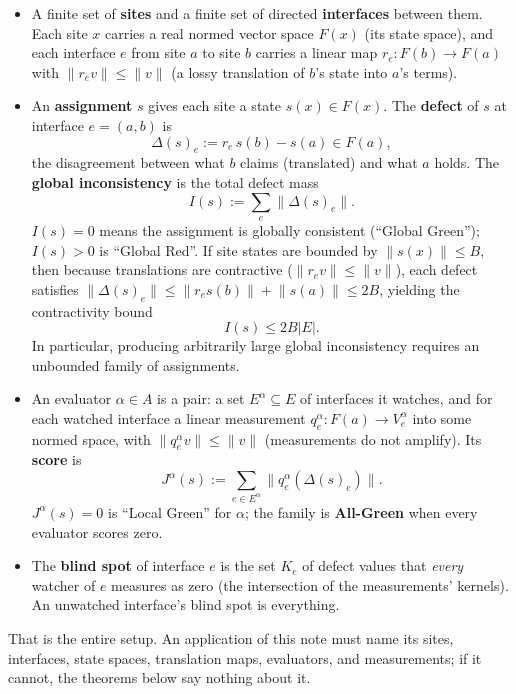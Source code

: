 \documentclass[
  11pt,
]{article}
\providecommand{\tightlist}{%
  \setlength{\itemsep}{0pt}\setlength{\parskip}{0pt}}
\theoremstyle{plain}
\theoremstyle{definition}\newtheorem{definition}[theorem]{Definition}
\theoremstyle{remark}\newtheorem*{remark}{Remark}
\begin{document}
\begin{itemize}
\tightlist
\item
  A finite set of \textbf{sites} and a finite set of directed
  \textbf{interfaces} between them. Each site \(x\) carries a real
  normed vector space \(F(x)\) (its state space), and each interface
  \(e\) from site \(a\) to site \(b\) carries a linear map
  \(r_e : F(b)\to F(a)\) with \(\lVert r_e v\rVert\le\lVert v\rVert\) (a
  lossy translation of \(b\)'s state into \(a\)'s terms).
\item
  An \textbf{assignment} \(s\) gives each site a state \(s(x)\in F(x)\).
  The \textbf{defect} of \(s\) at interface \(e=(a,b)\) is
  \[\Delta(s)_e := r_e\,s(b) - s(a) \in F(a),\] the disagreement between
  what \(b\) claims (translated) and what \(a\) holds. The
  \textbf{global inconsistency} is the total defect mass
  \[I(s) := \sum_e \lVert\Delta(s)_e\rVert .\] \(I(s)=0\) means the
  assignment is globally consistent (``Global Green''); \(I(s)>0\) is
  ``Global Red''. If site states are bounded by
  \(\lVert s(x)\rVert \le B\), then because translations are contractive
  (\(\lVert r_e v\rVert\le\lVert v\rVert\)), each defect satisfies
  \(\lVert\Delta(s)_e\rVert \le \lVert r_e s(b)\rVert + \lVert s(a)\rVert \le 2B\),
  yielding the contractivity bound \[I(s) \le 2B |E|.\] In particular,
  producing arbitrarily large global inconsistency requires an unbounded
  family of assignments.
\item
  An evaluator \(\alpha \in A\) is a pair: a set
  \(E^\alpha \subseteq E\) of interfaces it watches, and for each
  watched interface a linear measurement
  \(q_e^\alpha : F(a)\to V_e^\alpha\) into some normed space, with
  \(\lVert q_e^\alpha v\rVert\le\lVert v\rVert\) (measurements do not
  amplify). Its \textbf{score} is
  \[J^\alpha(s) := \sum_{e\in E^\alpha}\bigl\lVert q_e^\alpha(\Delta(s)_e)\bigr\rVert .\]
  \(J^\alpha(s)=0\) is ``Local Green'' for \(\alpha\); the family is
  \textbf{All-Green} when every evaluator scores zero.
\item
  The \textbf{blind spot} of interface \(e\) is the set \(K_e\) of
  defect values that \emph{every} watcher of \(e\) measures as zero (the
  intersection of the measurements' kernels). An unwatched interface's
  blind spot is everything.
\end{itemize}

That is the entire setup. An application of this note must name its
sites, interfaces, state spaces, translation maps, evaluators, and
measurements; if it cannot, the theorems below say nothing about it.
\end{document}
